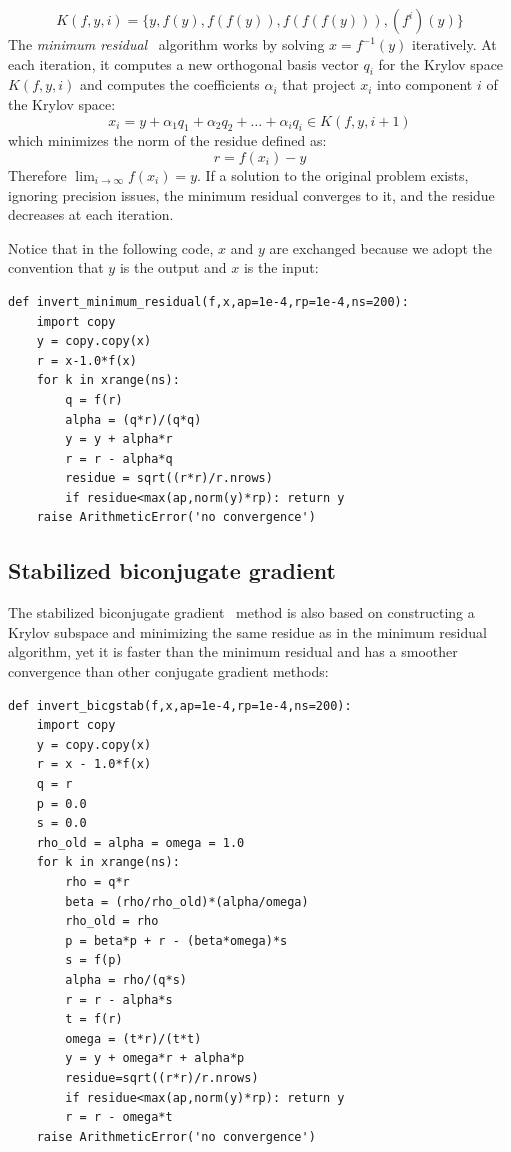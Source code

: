 \documentclass[justified,sixbynine]{tufte-book}
\def\ft{\small\tt}
\theoremstyle{plain}%
\theoremstyle{definition}
\theoremstyle{remark}
\begin{document}
\begin{fullwidth}
\begin{equation}
K(f,y,i) = \{y, f(y), f(f(y)), f(f(f(y))), (f^i)(y)\}
\end{equation}
The {\it minimum residual}~\cite{minres} algorithm works by solving $x=f^{-1}(y)$ iteratively. At each iteration, it computes a new orthogonal basis vector $q_i$ for the Krylov space $K(f,y,i)$ and computes the coefficients $\alpha_i$ that project $x_i$ into component $i$ of the Krylov space:
\begin{equation}
x_i = y + \alpha_1 q_1 + \alpha_2 q_2 + \dots + \alpha_i q_i \in K(f,y,i+1)
\end{equation}
which minimizes the norm of the residue defined as:
\begin{equation}
r = f(x_i) - y
\end{equation}
Therefore $\lim_{i\rightarrow\infty} f(x_i) = y$.
If a solution to the original problem exists, ignoring precision issues, the minimum residual converges to it, and the residue decreases at each iteration.

Notice that in the following code, $x$ and $y$ are exchanged because we adopt the convention that $y$ is the output and $x$ is the input:

\begin{lstlisting}[caption={in file: {\ft nlib.py}}]
def invert_minimum_residual(f,x,ap=1e-4,rp=1e-4,ns=200):
    import copy
    y = copy.copy(x)
    r = x-1.0*f(x)
    for k in xrange(ns):
        q = f(r)
        alpha = (q*r)/(q*q)
        y = y + alpha*r
        r = r - alpha*q
        residue = sqrt((r*r)/r.nrows)
        if residue<max(ap,norm(y)*rp): return y
    raise ArithmeticError('no convergence')
\end{lstlisting}

\goodbreak\subsection{Stabilized biconjugate gradient}


The stabilized biconjugate gradient~\cite{bicgstab} method is also based on constructing a Krylov subspace and minimizing the same residue as in the minimum residual algorithm, yet it is faster than the minimum residual and has a smoother convergence than other conjugate gradient methods:

\begin{lstlisting}[caption={in file: {\ft nlib.py}}]
def invert_bicgstab(f,x,ap=1e-4,rp=1e-4,ns=200):
    import copy
    y = copy.copy(x)
    r = x - 1.0*f(x)
    q = r
    p = 0.0
    s = 0.0
    rho_old = alpha = omega = 1.0
    for k in xrange(ns):
        rho = q*r
        beta = (rho/rho_old)*(alpha/omega)
        rho_old = rho
        p = beta*p + r - (beta*omega)*s
        s = f(p)
        alpha = rho/(q*s)
        r = r - alpha*s
        t = f(r)
        omega = (t*r)/(t*t)
        y = y + omega*r + alpha*p
        residue=sqrt((r*r)/r.nrows)
        if residue<max(ap,norm(y)*rp): return y
        r = r - omega*t
    raise ArithmeticError('no convergence')
\end{lstlisting}


\end{fullwidth}
\end{document}
